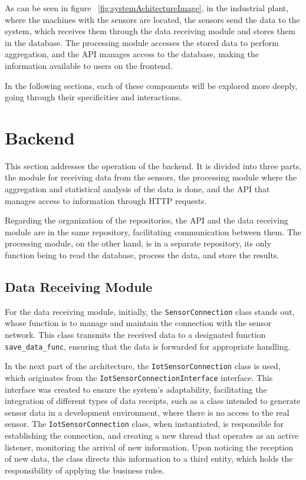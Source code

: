 As can be seen in figure ~\ref{fig:systemAchitectureImage}, in the industrial plant, where the machines with the sensors are located, the sensors send the data to the system, which receives them through the data receiving module and stores them in the database. The processing module accesses the stored data to perform aggregation, and the \gls{API} manages access to the database, making the information available to users on the frontend.

In the following sections, each of these components will be explored more deeply, going through their specificities and interactions.


\section[Backend]{Backend}
This section addresses the operation of the backend. It is divided into three parts, the module for receiving data from the sensors, the processing module where the aggregation and statistical analysis of the data is done, and the \gls{API} that manages access to information through \gls{HTTP} requests.

Regarding the organization of the repositories, the \gls{API} and the data receiving module are in the same repository, facilitating communication between them. The processing module, on the other hand, is in a separate repository, its only function being to read the database, process the data, and store the results.

\subsection{Data Receiving Module}\label{subsec:receiveDataModuleArch}
For the data receiving module, initially, the \texttt{SensorConnection} class stands out, whose function is to manage and maintain the connection with the sensor network. This class transmits the received data to a designated function \texttt{save\_data\_func}, ensuring that the data is forwarded for appropriate handling.

In the next part of the architecture, the \texttt{IotSensorConnection} class is used, which originates from the \texttt{IotSensorConnectionInterface} interface. This interface was created to ensure the system's adaptability, facilitating the integration of different types of data receipts, such as a class intended to generate sensor data in a development environment, where there is no access to the real sensor. The \texttt{IotSensorConnection} class, when instantiated, is responsible for establishing the connection, and creating a new thread that operates as an active listener, monitoring the arrival of new information. Upon noticing the reception of new data, the class directs this information to a third entity, which holds the responsibility of applying the business rules.

